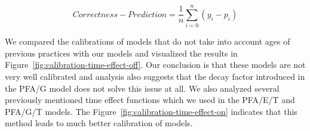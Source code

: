 \begin{equation} \label{eq-callibration}
  \mathit{Correctness} - \mathit{Prediction} = \frac{1}{n} \sum_{i=0}^{n} (y_i - p_i)
\end{equation}

We compared the calibrations of models that do not take into account ages of previous practices with our models and visualized the results in Figure~\ref{fig:calibration-time-effect-off}. Our conclusion is that these models are not very well calibrated and analysis also suggests that the decay factor introduced in the PFA/G model does not solve this issue at all. We also analyzed several previously mentioned time effect functions which we used in the PFA/E/T and PFA/G/T models. The Figure~\ref{fig:calibration-time-effect-on} indicates that this method leads to much better calibration of models.

